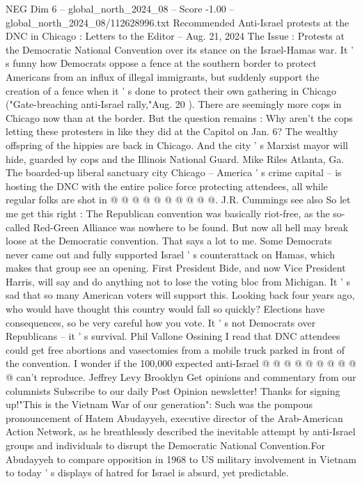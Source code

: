 \begin{textsample}{NEG Dim 6 – global\_north\_2024\_08 – Score -1.00 – global\_north\_2024\_08/112628996.txt}  \label{ex:f6_neg_160}
Recommended Anti-Israel protests at the DNC in Chicago : Letters to the Editor -- Aug. 21, 2024 The Issue : Protests at the Democratic National Convention over its stance on the Israel-Hamas war.
It ' s funny how Democrats oppose a fence at the southern border to protect Americans from an influx of illegal immigrants, but suddenly support the creation of a fence when it ' s done to protect their own gathering in Chicago ("Gate-breaching anti-Israel rally,"Aug. 20 ).
There are seemingly more cops in Chicago now than at the border.
But the question remains : Why aren't the cops letting these protesters in like they did at the Capitol on Jan. 6?
The wealthy offspring of the hippies are back in Chicago.
And the city ' s Marxist mayor will hide, guarded by cops and the Illinois National Guard.
Mike Riles Atlanta, Ga.
The boarded-up liberal sanctuary city Chicago -- America ' s crime capital -- is hosting the DNC with the entire police force protecting attendees, all while regular folks are shot in @ @ @ @ @ @ @ @ @ @.
J.R.
Cummings see also So let me get this right : The Republican convention was basically riot-free, as the so-called Red-Green Alliance was nowhere to be found.
But now all hell may break loose at the Democratic convention.
That says a lot to me.
Some Democrats never came out and fully supported Israel ' s counterattack on Hamas, which makes that group see an opening.
First President Bide, and now Vice President Harris, will say and do anything not to lose the voting bloc from Michigan.
It ' s sad that so many American voters will support this.
Looking back four years ago, who would have thought this country would fall so quickly?
Elections have consequences, so be very careful how you vote.
It ' s not Democrats over Republicans -- it ' s survival.
Phil Vallone Ossining I read that DNC attendees could get free abortions and vasectomies from a mobile truck parked in front of the convention.
I wonder if the 100,000 expected anti-Israel @ @ @ @ @ @ @ @ @ @ can't reproduce.
Jeffrey Levy Brooklyn Get opinions and commentary from our columnists Subscribe to our daily Post Opinion newsletter!
Thanks for signing up!"This is the Vietnam War of our generation": Such was the pompous pronouncement of Hatem Abudayyeh, executive director of the Arab-American Action Network, as he breathlessly described the inevitable attempt by anti-Israel groups and individuals to disrupt the Democratic National Convention.For Abudayyeh to compare opposition in 1968 to US military involvement in Vietnam to today ' s displays of hatred for Israel is absurd, yet predictable.

\end{textsample}
